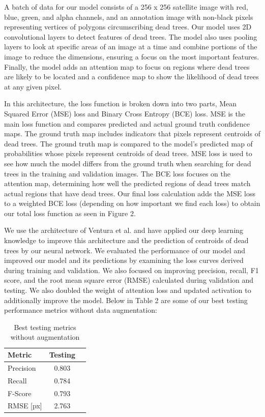 \documentclass[conference]{ieeetran}
\begin{document}
A batch of data for our model consists of a 256 x 256 satellite image with red, blue, green, and alpha channels, and an annotation image with non-black pixels representing vertices of polygons circumscribing dead trees. Our model uses 2D convolutional layers to detect features of dead trees. The model also uses pooling layers to look at specific areas of an image at a time and combine portions of the image to reduce the dimensions, ensuring a focus on the most important features. Finally, the model adds an attention map to focus on regions where dead trees are likely to be located and a confidence map to show the likelihood of dead trees at any given pixel. 

In this architecture, the loss function is broken down into two parts, Mean Squared Error (MSE) loss and Binary Cross Entropy (BCE) loss. MSE is the main loss function and compares predicted and actual ground truth confidence maps. The ground truth map includes indicators that pixels represent centroids of dead trees. The ground truth map is compared to the model’s predicted map of probabilities whose pixels represent centroids of dead trees. MSE loss is used to see how much the model differs from the ground truth when searching for dead trees in the training and validation images. The BCE loss focuses on the attention map, determining how well the predicted regions of dead trees match actual regions that have dead trees. Our final loss calculation adds the MSE loss to a weighted BCE loss (depending on how important we find each loss) to obtain our total loss function as seen in Figure 2. 

We use the architecture of Ventura et al. and have applied our deep learning knowledge to improve this architecture and the prediction of centroids of dead trees by our neural network. We evaluated the performance of our model and improved our model and its predictions by examining the loss curves derived during training and validation. We also focused on improving precision, recall, F1 score, and the root mean square error (RMSE) calculated during validation and testing. We also doubled the weight of attention loss and updated activation to additionally improve the model. Below in Table 2 are some of our best testing performance metrics without data augmentation:


\begin{table}[htbp]
  \centering
  \begin{tabular}{lcc}
    \hline
    \textbf{Metric} & \textbf{Testing} \\
    \hline
    Precision & 0.803 \\
    Recall    & 0.784 \\
    F-Score   & 0.793 \\
    RMSE [px] & 2.763 \\
    \hline
  \end{tabular}
  \caption{Best testing metrics without augmentation}
  \label{tab:metrics}
\end{table}
\end{document}
